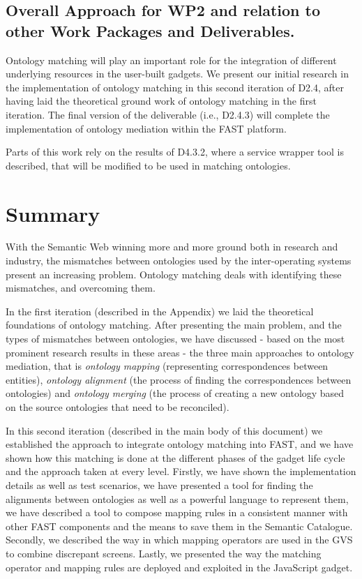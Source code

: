 \documentclass{fast_latex}
\begin{document}
\subsection{Overall Approach for WP2 and relation to other Work Packages and Deliverables.}
Ontology matching will play an important role for the integration of different underlying resources in the user-built gadgets. 
We present our initial research in the implementation of ontology matching in this second iteration of D2.4, after having laid the theoretical ground work of ontology matching in the first iteration. The final version of the deliverable (i.e., D2.4.3) will complete the implementation of ontology mediation within the FAST platform. 

Parts of this work rely on the results of D4.3.2, where a service wrapper tool is described, that will be modified to be used in matching ontologies.




\section{Summary}
\label{sec:summary}
With the Semantic Web winning more and more ground both in research and industry, the mismatches between ontologies used by the inter-operating systems present an increasing problem. Ontology matching deals with identifying these mismatches, and overcoming them. 

In the first iteration (described in the Appendix) we laid the theoretical foundations of ontology matching. After presenting the main problem, and the types of mismatches between ontologies, we have discussed - based on the most prominent research results in these areas - the three main approaches to ontology mediation, that is \textit{ontology mapping} (representing  correspondences between entities), \textit{ontology alignment} (the process of finding the correspondences between ontologies) and \textit{ontology merging }(the process of creating a new ontology based
on the source ontologies that need to be reconciled). 

In this second iteration (described in the main body of this document) we established the approach to integrate ontology matching into FAST, and we have shown how this matching is done at the different phases of the gadget life cycle and the approach taken at every level. Firstly, we have shown the implementation details as well as test scenarios, we have presented a tool for finding the alignments between ontologies as well as a powerful language to represent them, we have described a tool to compose mapping rules in a consistent manner with other FAST components and the means to save them in the Semantic Catalogue. Secondly, we described the way in which mapping operators are used in the GVS to combine discrepant screens. Lastly, we presented the way the matching operator and mapping rules are deployed and exploited in the JavaScript gadget.
\end{document}
